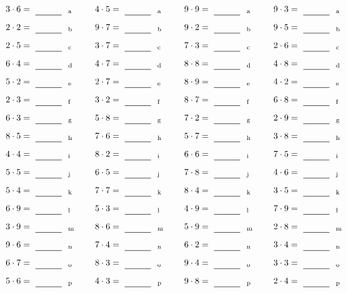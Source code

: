 \documentclass
[
  draft    = true,
  fontsize = 11pt,
  parskip  = half-
]
{scrartcl}
\begin{document}
\par\vfill\par
\begin{align*}
    \pline{3\cdot6}&=\rline{a}
  & \pline{4\cdot5}&=\rline{a}
  & \pline{9\cdot9}&=\rline{a}
  & \pline{9\cdot3}&=\rline{a} \\[1ex]
    \pline{2\cdot2}&=\rline{b}
  & \pline{9\cdot7}&=\rline{b}
  & \pline{9\cdot2}&=\rline{b}
  & \pline{9\cdot5}&=\rline{b} \\[1ex]
    \pline{2\cdot5}&=\rline{c}
  & \pline{3\cdot7}&=\rline{c}
  & \pline{7\cdot3}&=\rline{c}
  & \pline{2\cdot6}&=\rline{c} \\[1ex]
    \pline{6\cdot4}&=\rline{d}
  & \pline{4\cdot7}&=\rline{d}
  & \pline{8\cdot8}&=\rline{d}
  & \pline{4\cdot8}&=\rline{d} \\[1ex]
    \pline{5\cdot2}&=\rline{e}
  & \pline{2\cdot7}&=\rline{e}
  & \pline{8\cdot9}&=\rline{e}
  & \pline{4\cdot2}&=\rline{e} \\[1ex]
    \pline{2\cdot3}&=\rline{f}
  & \pline{3\cdot2}&=\rline{f}
  & \pline{8\cdot7}&=\rline{f}
  & \pline{6\cdot8}&=\rline{f} \\[1ex]
    \pline{6\cdot3}&=\rline{g}
  & \pline{5\cdot8}&=\rline{g}
  & \pline{7\cdot2}&=\rline{g}
  & \pline{2\cdot9}&=\rline{g} \\[1ex]
    \pline{8\cdot5}&=\rline{h}
  & \pline{7\cdot6}&=\rline{h}
  & \pline{5\cdot7}&=\rline{h}
  & \pline{3\cdot8}&=\rline{h} \\[1ex]
    \pline{4\cdot4}&=\rline{i}
  & \pline{8\cdot2}&=\rline{i}
  & \pline{6\cdot6}&=\rline{i}
  & \pline{7\cdot5}&=\rline{i} \\[1ex]
    \pline{5\cdot5}&=\rline{j}
  & \pline{6\cdot5}&=\rline{j}
  & \pline{7\cdot8}&=\rline{j}
  & \pline{4\cdot6}&=\rline{j} \\[1ex]
    \pline{5\cdot4}&=\rline{k}
  & \pline{7\cdot7}&=\rline{k}
  & \pline{8\cdot4}&=\rline{k}
  & \pline{3\cdot5}&=\rline{k} \\[1ex]
    \pline{6\cdot9}&=\rline{l}
  & \pline{5\cdot3}&=\rline{l}
  & \pline{4\cdot9}&=\rline{l}
  & \pline{7\cdot9}&=\rline{l} \\[1ex]
    \pline{3\cdot9}&=\rline{m}
  & \pline{8\cdot6}&=\rline{m}
  & \pline{5\cdot9}&=\rline{m}
  & \pline{2\cdot8}&=\rline{m} \\[1ex]
    \pline{9\cdot6}&=\rline{n}
  & \pline{7\cdot4}&=\rline{n}
  & \pline{6\cdot2}&=\rline{n}
  & \pline{3\cdot4}&=\rline{n} \\[1ex]
    \pline{6\cdot7}&=\rline{o}
  & \pline{8\cdot3}&=\rline{o}
  & \pline{9\cdot4}&=\rline{o}
  & \pline{3\cdot3}&=\rline{o} \\[1ex]
    \pline{5\cdot6}&=\rline{p}
  & \pline{4\cdot3}&=\rline{p}
  & \pline{9\cdot8}&=\rline{p}
  & \pline{2\cdot4}&=\rline{p}
\end{align*}
\end{document}
